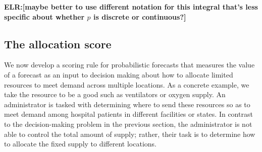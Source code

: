 \documentclass{article}
\def\elr#1{{\color{cyan}\textbf{ELR:[#1]}}}
\begin{document}
\elr{maybe better to use different notation for this integral that's less specific about whether $p$ is discrete or continuous?}

%


\subsection{The allocation score}
\label{sec:methods.allocation}

We now develop a scoring rule for probabilistic forecasts that measures the value of a forecast as an input to decision making about how to allocate limited resources to meet demand across multiple locations. As a concrete example, we take the resource to be a good such as ventilators or oxygen supply. An administrator is tasked with determining where to send these resources so as to meet demand among hospital patients in different facilities or states. In contrast to the decision-making problem in the previous section, the administrator is not able to control the total amount of supply; rather, their task is to determine how to allocate the fixed supply to different locations.
\end{document}
